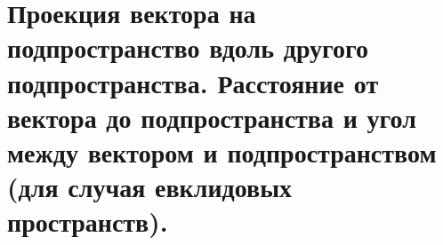 \section{
    Проекция вектора на подпространство вдоль другого подпространства. Расстояние от вектора до подпространства и угол между вектором и подпространством (для случая евклидовых пространств). 
}



